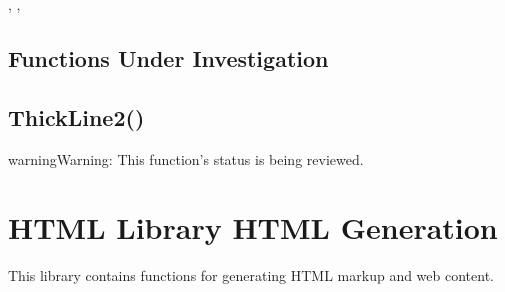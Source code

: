 \documentclass[letterpaper,10pt,english]{sphinxmanual}
\begin{document}
\sphinxAtStartPar
{}

\sphinxAtStartPar
{}, , 


\subsection{Functions Under Investigation}
\label{\detokenize{reference/graphics:functions-under-investigation}}
\ignorespaces 

\subsection{ThickLine2()}
\label{\detokenize{reference/graphics:thickline2}}\label{\detokenize{reference/graphics:index-26}}
\begin{sphinxadmonition}{warning}{Warning:}
\sphinxAtStartPar
{} This function’s status is being reviewed.
\end{sphinxadmonition}

\sphinxAtStartPar
{}

\begin{sphinxVerbatim}[commandchars=\\\{\}]
\end{sphinxVerbatim}

\sphinxstepscope


\section{HTML Library \sphinxhyphen{} HTML Generation}
\label{\detokenize{reference/html:html-library-html-generation}}\label{\detokenize{reference/html::doc}}
\sphinxAtStartPar
This library contains functions for generating HTML markup and web content.
\end{document}
